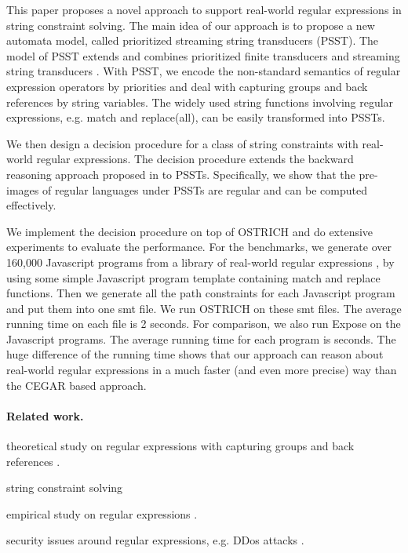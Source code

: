 This paper proposes a novel approach to support real-world regular expressions in string constraint solving. The main idea of our approach is to propose a new automata model, called prioritized streaming string transducers (PSST). The model of PSST extends and combines prioritized finite transducers \cite{BM17} and streaming string transducers \cite{AC10,AD11}. With PSST, we encode the non-standard semantics of regular expression operators by priorities and deal with capturing groups and back references by string variables. 
The widely used string functions involving regular expressions, e.g. match and replace(all), can be easily transformed into PSSTs. 

We then design a decision procedure for a class of string constraints with real-world regular expressions. The decision procedure extends the backward reasoning approach proposed in \cite{CHL+19} to PSSTs. Specifically, we show that the pre-images of regular languages under PSSTs are regular and can be computed effectively. 

We implement the decision procedure on top of OSTRICH and do extensive experiments to evaluate the performance. For the benchmarks, we generate over 160,000 Javascript programs from a library of real-world regular expressions \cite{DMC+19}, by using some simple Javascript program template containing match and replace functions.  Then we generate all the path constraints for each Javascript program and put them into one smt file. We run OSTRICH on these smt files. The average running time on each file is 2 seconds. For comparison, we also run Expose on the Javascript programs. The average running time for each program is  seconds. The huge difference of the running time shows that our approach can reason about real-world regular expressions in a much faster (and even more precise) way than the CEGAR based approach.


\paragraph*{Related work.}

theoretical study on regular expressions with capturing groups and back references \cite{CSY03,CN09,Freydenberger13,Schmid16,FS19}.

string constraint solving
\cite{ZAM19}


empirical study on regular expressions \cite{MDD+19}.

security issues around regular expressions, e.g. DDos attacks \cite{SP18,DCSL18}.

